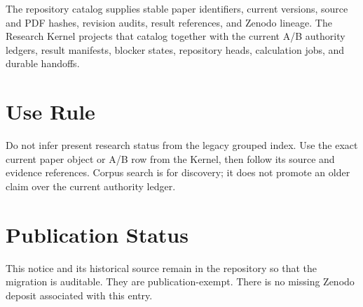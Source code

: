 \documentclass[11pt]{article}
\begin{document}
The repository catalog supplies stable paper identifiers, current versions, source and PDF
hashes, revision audits, result references, and Zenodo lineage. The Research Kernel projects
that catalog together with the current A/B authority ledgers, result manifests, blocker
states, repository heads, calculation jobs, and durable handoffs.

\section{Use Rule}

Do not infer present research status from the legacy grouped index. Use the exact current
paper object or A/B row from the Kernel, then follow its source and evidence references.
Corpus search is for discovery; it does not promote an older claim over the current
authority ledger.

\section{Publication Status}

This notice and its historical source remain in the repository so that the migration is
auditable. They are publication-exempt. There is no missing Zenodo deposit associated with
this entry.
\end{document}
